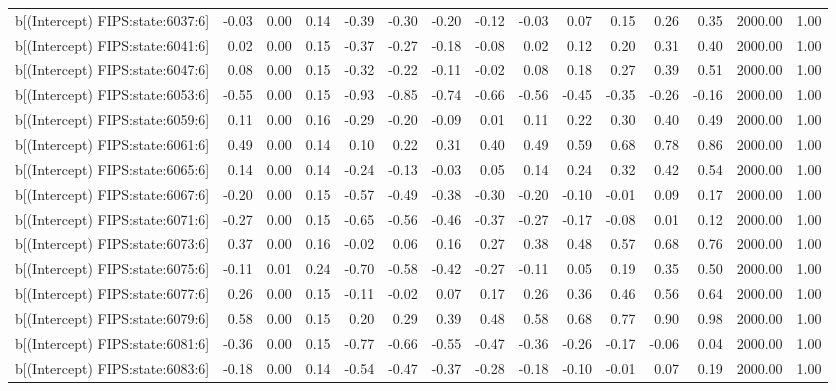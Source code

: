\begin{table}[ht]
\begin{tabular}{rrrrrrrrrrrrrrr}
  b[(Intercept) FIPS:state:6037:6] & -0.03 & 0.00 & 0.14 & -0.39 & -0.30 & -0.20 & -0.12 & -0.03 & 0.07 & 0.15 & 0.26 & 0.35 & 2000.00 & 1.00 \\ 
  b[(Intercept) FIPS:state:6041:6] & 0.02 & 0.00 & 0.15 & -0.37 & -0.27 & -0.18 & -0.08 & 0.02 & 0.12 & 0.20 & 0.31 & 0.40 & 2000.00 & 1.00 \\ 
  b[(Intercept) FIPS:state:6047:6] & 0.08 & 0.00 & 0.15 & -0.32 & -0.22 & -0.11 & -0.02 & 0.08 & 0.18 & 0.27 & 0.39 & 0.51 & 2000.00 & 1.00 \\ 
  b[(Intercept) FIPS:state:6053:6] & -0.55 & 0.00 & 0.15 & -0.93 & -0.85 & -0.74 & -0.66 & -0.56 & -0.45 & -0.35 & -0.26 & -0.16 & 2000.00 & 1.00 \\ 
  b[(Intercept) FIPS:state:6059:6] & 0.11 & 0.00 & 0.16 & -0.29 & -0.20 & -0.09 & 0.01 & 0.11 & 0.22 & 0.30 & 0.40 & 0.49 & 2000.00 & 1.00 \\ 
  b[(Intercept) FIPS:state:6061:6] & 0.49 & 0.00 & 0.14 & 0.10 & 0.22 & 0.31 & 0.40 & 0.49 & 0.59 & 0.68 & 0.78 & 0.86 & 2000.00 & 1.00 \\ 
  b[(Intercept) FIPS:state:6065:6] & 0.14 & 0.00 & 0.14 & -0.24 & -0.13 & -0.03 & 0.05 & 0.14 & 0.24 & 0.32 & 0.42 & 0.54 & 2000.00 & 1.00 \\ 
  b[(Intercept) FIPS:state:6067:6] & -0.20 & 0.00 & 0.15 & -0.57 & -0.49 & -0.38 & -0.30 & -0.20 & -0.10 & -0.01 & 0.09 & 0.17 & 2000.00 & 1.00 \\ 
  b[(Intercept) FIPS:state:6071:6] & -0.27 & 0.00 & 0.15 & -0.65 & -0.56 & -0.46 & -0.37 & -0.27 & -0.17 & -0.08 & 0.01 & 0.12 & 2000.00 & 1.00 \\ 
  b[(Intercept) FIPS:state:6073:6] & 0.37 & 0.00 & 0.16 & -0.02 & 0.06 & 0.16 & 0.27 & 0.38 & 0.48 & 0.57 & 0.68 & 0.76 & 2000.00 & 1.00 \\ 
  b[(Intercept) FIPS:state:6075:6] & -0.11 & 0.01 & 0.24 & -0.70 & -0.58 & -0.42 & -0.27 & -0.11 & 0.05 & 0.19 & 0.35 & 0.50 & 2000.00 & 1.00 \\ 
  b[(Intercept) FIPS:state:6077:6] & 0.26 & 0.00 & 0.15 & -0.11 & -0.02 & 0.07 & 0.17 & 0.26 & 0.36 & 0.46 & 0.56 & 0.64 & 2000.00 & 1.00 \\ 
  b[(Intercept) FIPS:state:6079:6] & 0.58 & 0.00 & 0.15 & 0.20 & 0.29 & 0.39 & 0.48 & 0.58 & 0.68 & 0.77 & 0.90 & 0.98 & 2000.00 & 1.00 \\ 
  b[(Intercept) FIPS:state:6081:6] & -0.36 & 0.00 & 0.15 & -0.77 & -0.66 & -0.55 & -0.47 & -0.36 & -0.26 & -0.17 & -0.06 & 0.04 & 2000.00 & 1.00 \\ 
  b[(Intercept) FIPS:state:6083:6] & -0.18 & 0.00 & 0.14 & -0.54 & -0.47 & -0.37 & -0.28 & -0.18 & -0.10 & -0.01 & 0.07 & 0.19 & 2000.00 & 1.00 \\ 

\end{tabular}
\end{table}
